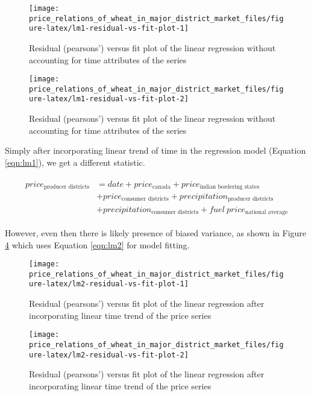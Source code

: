 \documentclass[
  12pt,
]{article}
\begin{document}
\begin{figure}

{\centering \texttt{[image: price\_relations\_of\_wheat\_in\_major\_district\_market\_files/figure-latex/lm1-residual-vs-fit-plot-1]} 

}

\caption{Residual (pearsons') versus fit plot of the linear regression without accounting for time attributes of the series}\label{fig:lm1-residual-vs-fit-plot1}
\end{figure}
\begin{figure}

{\centering \texttt{[image: price\_relations\_of\_wheat\_in\_major\_district\_market\_files/figure-latex/lm1-residual-vs-fit-plot-2]} 

}

\caption{Residual (pearsons') versus fit plot of the linear regression without accounting for time attributes of the series}\label{fig:lm1-residual-vs-fit-plot2}
\end{figure}

Simply after incorporating linear trend of time in the regression model (Equation \ref{eqn:lm1}), we get a different statistic.

\begin{equation}
\label{eqn:lm2}
\begin{aligned}
\begin{split}
price_{\textrm{producer districts}} &= date + price_{\textrm{canada}} + price_{\textrm{indian bordering states}} \\ &+
price_{\textrm{consumer districts}} + precipitation_{\textrm{producer districts}} \\ &+
precipitation_{\textrm{consumer districts}} + fuel~price_{\textrm{national average}}
\end{split}
\end{aligned}
\end{equation}

However, even then there is likely presence of biased variance, as shown in Figure \ref{fig:lm2-residual-vs-fit-plot2} which uses Equation \ref{eqn:lm2} for model fitting.

\begin{figure}

{\centering \texttt{[image: price\_relations\_of\_wheat\_in\_major\_district\_market\_files/figure-latex/lm2-residual-vs-fit-plot-1]} 

}

\caption{Residual (pearsons') versus fit plot of the linear regression after incorporating linear time trend of the price series}\label{fig:lm2-residual-vs-fit-plot1}
\end{figure}
\begin{figure}

{\centering \texttt{[image: price\_relations\_of\_wheat\_in\_major\_district\_market\_files/figure-latex/lm2-residual-vs-fit-plot-2]} 

}

\caption{Residual (pearsons') versus fit plot of the linear regression after incorporating linear time trend of the price series}\label{fig:lm2-residual-vs-fit-plot2}
\end{figure}
\end{document}
